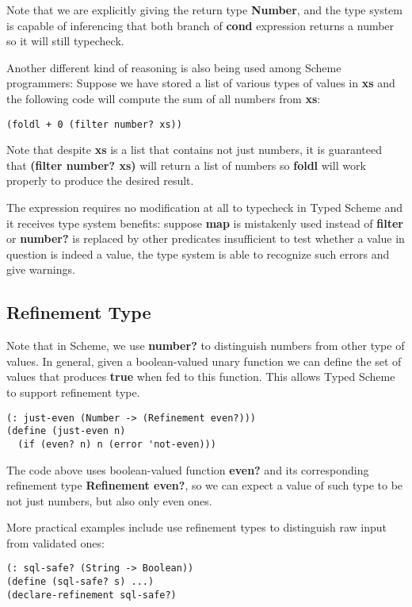 Note that we are explicitly giving the return type \textbf{Number},
and the type system is capable of inferencing that
both branch of \textbf{cond} expression returns a number
so it will still typecheck.

Another different kind of reasoning is also being used among Scheme programmers:
Suppose we have stored a list of various types of values in \textbf{xs}
and the following code will compute the sum of all numbers from \textbf{xs}:

\begin{verbatim}
(foldl + 0 (filter number? xs))
\end{verbatim}

Note that despite \textbf{xs} is a list that contains not just numbers,
it is guaranteed that \textbf{(filter number? xs)} will return a list of numbers
so \textbf{foldl} will work properly to produce the desired result.

The expression requires no modification at all to typecheck in Typed Scheme
and it receives type system benefits: suppose \textbf{map} is mistakenly
used instead of \textbf{filter} or \textbf{number?} is replaced by
other predicates insufficient to test whether a value in question is indeed a value,
the type system is able to recognize such errors and give warnings.

\subsection{Refinement Type}

Note that in Scheme, we use \textbf{number?} to distinguish numbers
from other type of values.
In general, given a boolean-valued unary function
we can define the set of values that produces \textbf{true} when fed to this function.
This allows Typed Scheme to support refinement type.

\begin{verbatim}
(: just-even (Number -> (Refinement even?)))
(define (just-even n)
  (if (even? n) n (error 'not-even)))
\end{verbatim}

The code above uses boolean-valued function \textbf{even?}
and its corresponding refinement type \textbf{Refinement even?},
so we can expect a value of such type to be not just numbers, but also only even ones.

More practical examples include use refinement types to distinguish raw input
from validated ones:

\begin{verbatim}
(: sql-safe? (String -> Boolean))
(define (sql-safe? s) ...)
(declare-refinement sql-safe?)
\end{verbatim}

